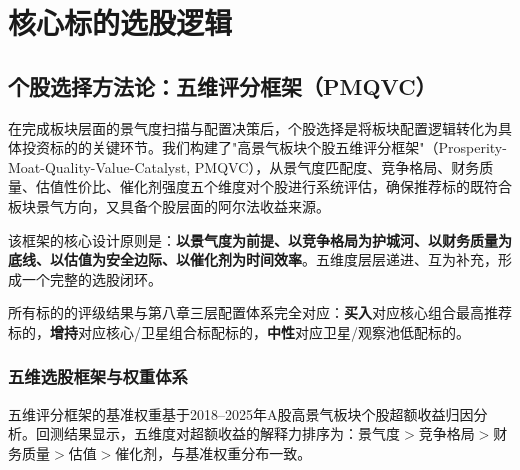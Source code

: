 
\chapter{核心标的选股逻辑}

\section{个股选择方法论：五维评分框架（PMQVC）}

在完成板块层面的景气度扫描与配置决策后，个股选择是将板块配置逻辑转化为具体投资标的的关键环节。我们构建了"高景气板块个股五维评分框架"（Prosperity-Moat-Quality-Value-Catalyst, PMQVC），从景气度匹配度、竞争格局、财务质量、估值性价比、催化剂强度五个维度对个股进行系统评估，确保推荐标的既符合板块景气方向，又具备个股层面的阿尔法收益来源。

该框架的核心设计原则是：\textbf{以景气度为前提、以竞争格局为护城河、以财务质量为底线、以估值为安全边际、以催化剂为时间效率}。五维度层层递进、互为补充，形成一个完整的选股闭环。

所有标的的评级结果与第八章三层配置体系完全对应：\textbf{买入}对应核心组合最高推荐标的，\textbf{增持}对应核心/卫星组合标配标的，\textbf{中性}对应卫星/观察池低配标的。

\subsection{五维选股框架与权重体系}

五维评分框架的基准权重基于2018--2025年A股高景气板块个股超额收益归因分析。回测结果显示，五维度对超额收益的解释力排序为：景气度$>$竞争格局$>$财务质量$>$估值$>$催化剂，与基准权重分布一致。

